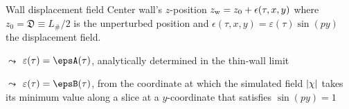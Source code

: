 \begin{frame}{Wall displacement field}
    Center wall's $z$-position $z_\mathrm{w}=z_0 + \epsilon(\tau, x, y)$ where $z_0 = \mathfrak{D} \equiv L_\#/2$ is the unperturbed position and 
    \( \epsilon(\tau, x, y) = \varepsilon(\tau) \sin(py) \) the displacement field.
    \medskip

    \begin{description}[font=\scshape]
        \item[\descItem{first approach}]<2-> $\leadsto$ $\varepsilon(\tau) = \epsA(\tau)$, analytically determined in the thin-wall limit 
        \item[\descItem{second approach}]<3-> $\leadsto$ $\varepsilon(\tau) = \epsB(\tau)$, from the coordinate at which the simulated field $\abs{\chi}$ takes its minimum value along a slice at a $y$-coordinate that satisfies $\sin(py)=1$ %
    \end{description}
    
    \medskip

\begin{notes}[4][DW]
\end{notes}

\end{frame}


